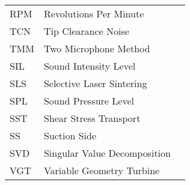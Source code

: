 \begin{longtable}{lll}
RPM & Revolutions Per Minute \\
TCN & Tip Clearance Noise \\
TMM & Two Microphone Method \\
SIL & Sound Intensity Level \\
SLS & Selective Laser Sintering \\
SPL & Sound Pressure Level \\
SST & Shear Stress Transport \\
SS & Suction Side \\
SVD & Singular Value Decomposition \\
VGT & Variable Geometry Turbine \\
\end{longtable}

\normalsize